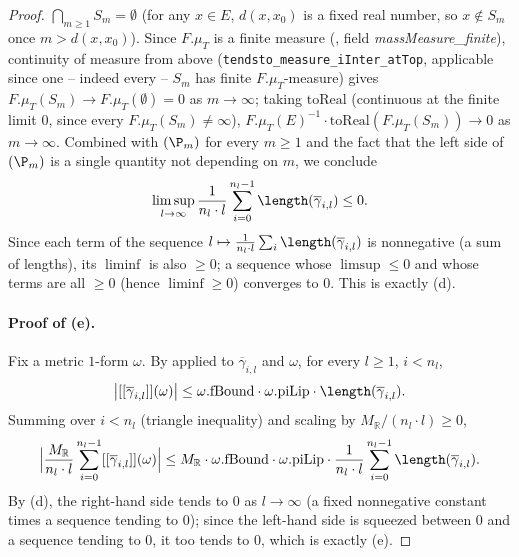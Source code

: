 \begin{proof}
  $\bigcap_{m\ge1} S_m = \emptyset$ (for any $x\in E$, $d(x,x_0)$ is a fixed real number, so
  $x\notin S_m$ once $m>d(x,x_0)$). Since $F.\mu_T$ is a finite measure
  (, field \emph{massMeasure\_finite}), continuity of measure from above
  (\texttt{tendsto\_measure\_iInter\_atTop}, applicable since one -- indeed every -- $S_m$ has
  finite $F.\mu_T$-measure) gives $F.\mu_T(S_m) \to F.\mu_T(\emptyset) = 0$ as $m\to\infty$; taking
  $\mathrm{toReal}$ (continuous at the finite limit $0$, since every $F.\mu_T(S_m)\ne\infty$),
  $F.\mu_T(E)^{-1}\cdot\mathrm{toReal}(F.\mu_T(S_m)) \to 0$ as $m\to\infty$. Combined with
  $(\P_m)$ for every $m\ge1$ and the fact that the left side of $(\P_m)$ is a single quantity not
  depending on $m$, we conclude
  \[
    \limsup_{l\to\infty} \frac1{n_l\cdot l}\sum_{i=0}^{n_l-1}\length(\overline\gamma_{i,l}) \le 0
    .
  \]
  Since each term of the sequence $l\mapsto \frac1{n_l\cdot l}\sum_{i}\length(\overline\gamma_{i,l})$
  is nonnegative (a sum of lengths), its $\liminf$ is also $\ge0$; a sequence whose $\limsup\le0$
  and whose terms are all $\ge0$ (hence $\liminf\ge0$) converges to $0$. This is exactly (d).

  \paragraph{Proof of (e).} Fix a metric $1$-form $\omega$. By  applied
  to $\overline\gamma_{i,l}$ and $\omega$, for every $l\ge1$, $i<n_l$,
  \[
    \bigl|[[\overline\gamma_{i,l}]](\omega)\bigr| \le \omega.\mathrm{fBound}\cdot
      \omega.\mathrm{piLip}\cdot\length(\overline\gamma_{i,l})
    .
  \]
  Summing over $i<n_l$ (triangle inequality) and scaling by $M_{\mathbb R}/(n_l\cdot l)\ge0$,
  \[
    \Bigl|\frac{M_{\mathbb R}}{n_l\cdot l}\sum_{i=0}^{n_l-1}[[\overline\gamma_{i,l}]](\omega)\Bigr|
    \le M_{\mathbb R}\cdot\omega.\mathrm{fBound}\cdot\omega.\mathrm{piLip}\cdot
      \frac1{n_l\cdot l}\sum_{i=0}^{n_l-1}\length(\overline\gamma_{i,l})
    .
  \]
  By (d), the right-hand side tends to $0$ as $l\to\infty$ (a fixed nonnegative constant times a
  sequence tending to $0$); since the left-hand side is squeezed between $0$ and a sequence tending
  to $0$, it too tends to $0$, which is exactly (e).
\end{proof}
